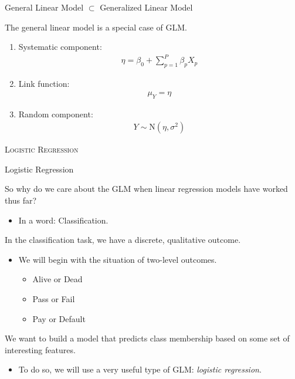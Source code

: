 \documentclass{beamer}\usepackage[]{graphicx}\usepackage[]{color}
\begin{document}

\begin{frame}{General Linear Model $\subset$ Generalized Linear Model}
  
  The general linear model is a special case of GLM.
  \vb  
  \begin{enumerate}
  \item Systematic component:
    \begin{align*}
      \eta = \beta_0 + \sum_{p = 1}^P \beta_p X_p
    \end{align*}
  \item Link function:
    \begin{align*}
      \mu_Y = \eta
    \end{align*}
  \item Random component:
    \begin{align*}
      Y \sim \text{N}(\eta, \sigma^2)
    \end{align*}
  \end{enumerate}
  
\end{frame}


\begin{frame}{}
  
  \begin{center}
    \Huge{\textsc{Logistic Regression}}
  \end{center}
  
\end{frame}


\begin{frame}{Logistic Regression}
  
  So why do we care about the GLM when linear regression models have worked
  thus far?  
  \begin{itemize}
  \item In a word: Classification.
  \end{itemize}
  \vb
  In the classification task, we have a discrete, qualitative outcome.
  \begin{itemize}
  \item We will begin with the situation of two-level outcomes.
    \begin{itemize}
    \item Alive or Dead
    \item Pass or Fail
    \item Pay or Default
    \end{itemize}
  \end{itemize}
  \vb
  We want to build a model that predicts class membership based on some set of 
  interesting features.
  \begin{itemize}
  \item To do so, we will use a very useful type of GLM: \emph{logistic 
    regression}.
  \end{itemize}
  
\end{frame}
\end{document}
